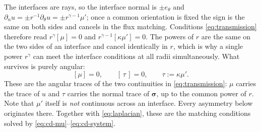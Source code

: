 \documentclass[10pt,pdftex]{amsart}%
\numberwithin{equation}{section}
\newcommand{\bsig}{\boldsymbol{\sigma}}
\begin{document}
The interfaces are rays, so the interface normal is $\pm e_\theta$ and $\partial_nu=\pm r^{-1}\partial_\theta u=\pm r^{\gamma-1}\mu'$; once a common orientation is fixed the sign is the same on both sides and cancels in the flux matching.  Conditions \eqref{eq:transmission} therefore read $r^{\gamma}[\mu]=0$ and $r^{\gamma-1}[\kappa\mu']=0$.  The powers of $r$ are the same on the two sides of an interface and cancel identically in $r$, which is why a single power $r^\gamma$ can meet the interface conditions at all radii simultaneously.  What survives is purely angular:
\begin{equation}\label{eq:angular-transmission}
  [\mu]=0,\qquad [\,\tau\,]=0,\qquad \tau:=\kappa\mu' .
\end{equation}
These are the angular traces of the two continuities in \eqref{eq:transmission}: $\mu$ carries the trace of $u$ and $\tau$ carries the normal trace of $\bsig$, up to the common power of $r$.  Note that $\mu'$ itself is \emph{not} continuous across an interface.  Every asymmetry below originates there.  Together with \eqref{eq:laplacian}, these are the matching conditions solved by \eqref{eq:cd-mu}--\eqref{eq:cd-system}.
\end{document}
